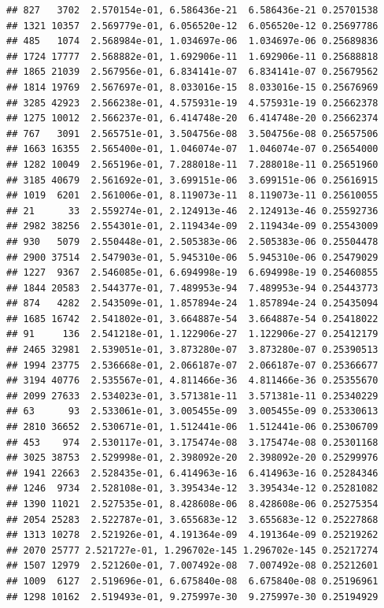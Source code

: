 \documentclass[
]{article}
\begin{document}
\begin{verbatim}
## 827   3702  2.570154e-01, 6.586436e-21  6.586436e-21 0.25701538
## 1321 10357  2.569779e-01, 6.056520e-12  6.056520e-12 0.25697786
## 485   1074  2.568984e-01, 1.034697e-06  1.034697e-06 0.25689836
## 1724 17777  2.568882e-01, 1.692906e-11  1.692906e-11 0.25688818
## 1865 21039  2.567956e-01, 6.834141e-07  6.834141e-07 0.25679562
## 1814 19769  2.567697e-01, 8.033016e-15  8.033016e-15 0.25676969
## 3285 42923  2.566238e-01, 4.575931e-19  4.575931e-19 0.25662378
## 1275 10012  2.566237e-01, 6.414748e-20  6.414748e-20 0.25662374
## 767   3091  2.565751e-01, 3.504756e-08  3.504756e-08 0.25657506
## 1663 16355  2.565400e-01, 1.046074e-07  1.046074e-07 0.25654000
## 1282 10049  2.565196e-01, 7.288018e-11  7.288018e-11 0.25651960
## 3185 40679  2.561692e-01, 3.699151e-06  3.699151e-06 0.25616915
## 1019  6201  2.561006e-01, 8.119073e-11  8.119073e-11 0.25610055
## 21      33  2.559274e-01, 2.124913e-46  2.124913e-46 0.25592736
## 2982 38256  2.554301e-01, 2.119434e-09  2.119434e-09 0.25543009
## 930   5079  2.550448e-01, 2.505383e-06  2.505383e-06 0.25504478
## 2900 37514  2.547903e-01, 5.945310e-06  5.945310e-06 0.25479029
## 1227  9367  2.546085e-01, 6.694998e-19  6.694998e-19 0.25460855
## 1844 20583  2.544377e-01, 7.489953e-94  7.489953e-94 0.25443773
## 874   4282  2.543509e-01, 1.857894e-24  1.857894e-24 0.25435094
## 1685 16742  2.541802e-01, 3.664887e-54  3.664887e-54 0.25418022
## 91     136  2.541218e-01, 1.122906e-27  1.122906e-27 0.25412179
## 2465 32981  2.539051e-01, 3.873280e-07  3.873280e-07 0.25390513
## 1994 23775  2.536668e-01, 2.066187e-07  2.066187e-07 0.25366677
## 3194 40776  2.535567e-01, 4.811466e-36  4.811466e-36 0.25355670
## 2099 27633  2.534023e-01, 3.571381e-11  3.571381e-11 0.25340229
## 63      93  2.533061e-01, 3.005455e-09  3.005455e-09 0.25330613
## 2810 36652  2.530671e-01, 1.512441e-06  1.512441e-06 0.25306709
## 453    974  2.530117e-01, 3.175474e-08  3.175474e-08 0.25301168
## 3025 38753  2.529998e-01, 2.398092e-20  2.398092e-20 0.25299976
## 1941 22663  2.528435e-01, 6.414963e-16  6.414963e-16 0.25284346
## 1246  9734  2.528108e-01, 3.395434e-12  3.395434e-12 0.25281082
## 1390 11021  2.527535e-01, 8.428608e-06  8.428608e-06 0.25275354
## 2054 25283  2.522787e-01, 3.655683e-12  3.655683e-12 0.25227868
## 1313 10278  2.521926e-01, 4.191364e-09  4.191364e-09 0.25219262
## 2070 25777 2.521727e-01, 1.296702e-145 1.296702e-145 0.25217274
## 1507 12979  2.521260e-01, 7.007492e-08  7.007492e-08 0.25212601
## 1009  6127  2.519696e-01, 6.675840e-08  6.675840e-08 0.25196961
## 1298 10162  2.519493e-01, 9.275997e-30  9.275997e-30 0.25194929

\end{verbatim}
\end{document}
